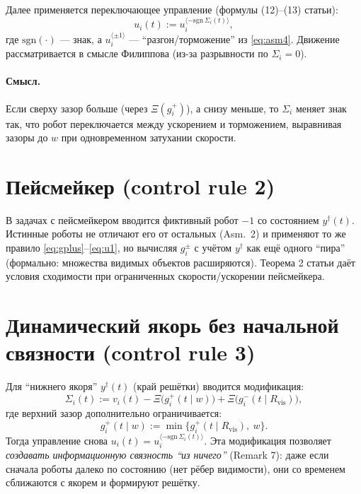 \documentclass[12pt,a4paper]{article}
\begin{document}
Далее применяется переключающее управление (формулы (12)--(13) статьи):
\begin{equation}
  u_i(t) := u_i^{\langle -\mathrm{sgn}\,\Sigma_i(t)\rangle},
  \label{eq:u1}
\end{equation}
где $\mathrm{sgn}(\cdot)$ --- знак, а $u_i^{\langle\pm1\rangle}$ --- ``разгон/торможение'' из \eqref{eq:asm4}.
Движение рассматривается в смысле Филиппова (из-за разрывности по $\Sigma_i=0$).

\paragraph{Смысл.}
Если сверху зазор больше (через $\Xi(g_i^+)$), а снизу меньше, то $\Sigma_i$ меняет знак так, что робот
переключается между ускорением и торможением, выравнивая зазоры до $w$ при одновременном затухании скорости.

\section{Пейсмейкер (control rule 2)}

В задачах с пейсмейкером вводится фиктивный робот $-1$ со состоянием $y^\dagger(t)$.
Истинные роботы не отличают его от остальных (Asm.~2) и применяют то же правило \eqref{eq:gplus}--\eqref{eq:u1},
но вычисляя $g_i^\pm$ с учётом $y^\dagger$ как ещё одного ``пира'' (формально: множества видимых объектов расширяются).
Теорема 2 статьи даёт условия сходимости при ограниченных скорости/ускорении пейсмейкера.

\section{Динамический якорь без начальной связности (control rule 3)}

Для ``нижнего якоря'' $y^\dagger(t)$ (край решётки) вводится модификация:
\begin{equation}
  \Sigma_i(t) := v_i(t) - \Xi\!\bigl(g_i^+(t\mid w)\bigr) + \Xi\!\bigl(g_i^-(t\mid R_{\mathrm{vis}})\bigr),
  \label{eq:Sigma3}
\end{equation}
где верхний зазор дополнительно ограничивается:
\begin{equation}
  g_i^+(t\mid w) := \min\{g_i^+(t\mid R_{\mathrm{vis}}),\ w\}.
  \label{eq:gplus_clip}
\end{equation}
Тогда управление снова $u_i(t)=u_i^{\langle -\mathrm{sgn}\,\Sigma_i(t)\rangle}$.
Эта модификация позволяет \emph{создавать информационную связность ``из ничего''} (Remark 7): даже если сначала роботы далеко
по состоянию (нет рёбер видимости), они со временем сближаются с якорем и формируют решётку.
\end{document}
